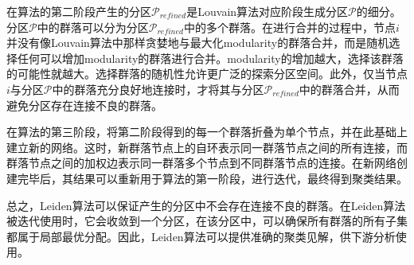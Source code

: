   在算法的第二阶段产生的分区$\mathcal{P}_{refined}$是Louvain算法对应阶段生成分区$\mathcal{P}$的细分。分区$\mathcal{P}$中的群落可以分为分区$\mathcal{P}_{refined}$中的多个群落。在进行合并的过程中，节点$i$并没有像Louvain算法中那样贪婪地与最大化modularity的群落合并，而是随机选择任何可以增加modularity的群落进行合并。modularity的增加越大，选择该群落的可能性就越大\cite{traag2015faster}。选择群落的随机性允许更广泛的探索分区空间。此外，仅当节点$i$与分区$\mathcal{P}$中的群落充分良好地连接时，才将其与分区$\mathcal{P}_{refined}$中的群落合并，从而避免分区存在连接不良的群落。

  在算法的第三阶段，将第二阶段得到的每一个群落折叠为单个节点，并在此基础上建立新的网络。这时，新群落节点上的自环表示同一群落节点之间的所有连接，而群落节点之间的加权边表示同一群落多个节点到不同群落节点的连接。在新网络创建完毕后，其结果可以重新用于算法的第一阶段，进行迭代，最终得到聚类结果。

  总之，Leiden算法可以保证产生的分区中不会存在连接不良的群落。在Leiden算法被迭代使用时，它会收敛到一个分区，在该分区中，可以确保所有群落的所有子集都属于局部最优分配。因此，Leiden算法可以提供准确的聚类见解，供下游分析使用。

